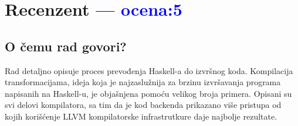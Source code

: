 \documentclass[a4paper]{report}
\newcommand{\odgovor}[1]{\textcolor{blue}{#1}}
\begin{document}
	
	\chapter{Recenzent \odgovor{--- ocena:5} }
	
	
	\section{O čemu rad govori?}
	Rad detaljno opisuje proces prevođenja Haskell-a do izvršnog koda. Kompilacija transformacijama, ideja koja je najzaslužnija za brzinu izvršavanja programa napisanih na Haskell-u, je objašnjena pomoću velikog broja primera. Opisani su svi delovi kompilatora, sa tim da je kod backenda prikazano više pristupa od kojih korišćenje LLVM kompilatorske infrastrutkure daje najbolje rezultate.
	
\end{document}
